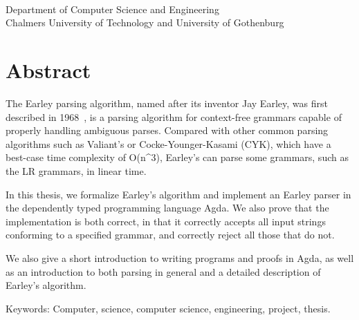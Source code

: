 \titleA{}\\
\titleB{}\\
\me{}\\
Department of Computer Science and Engineering\\
Chalmers University of Technology and University of Gothenburg
\vspace{0.5cm}

\thispagestyle{plain}			%
\vspace{0pt plus 1.0pt}
\section*{Abstract}

The Earley parsing algorithm, named after its inventor Jay Earley, was first
described in 1968~\cite{Earley}, is a parsing algorithm for context-free
grammars capable of properly handling ambiguous parses. Compared with other
common parsing algorithms such as Valiant's or Cocke-Younger-Kasami (CYK), which
have a best-case time complexity of O(n^3), Earley's can parse some grammars,
such as the LR grammars, in linear time.

In this thesis, we formalize Earley's algorithm and implement an Earley parser
in the dependently typed programming language Agda.  We also prove that the
implementation is both correct, in that it correctly accepts all input strings
conforming to a specified grammar, and correctly reject all those that do not.

We also give a short introduction to writing programs and proofs in Agda, as
well as an introduction to both parsing in general and a detailed description
of Earley's algorithm.

\vfill
Keywords: Computer, science, computer science, engineering, project, thesis.

\newpage				%
\thispagestyle{empty}
\mbox{}
